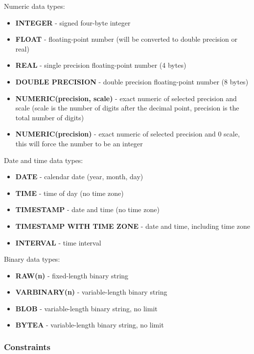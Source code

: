 \documentclass[a4paper,12pt]{article}
\begin{document}
Numeric data types:
\begin{itemize}
	\item \textbf{INTEGER} - signed four-byte integer
	\item \textbf{FLOAT} - floating-point number (will be converted to double precision or real)
	\item \textbf{REAL} - single precision floating-point number (4 bytes)
	\item \textbf{DOUBLE PRECISION} - double precision floating-point number (8 bytes)
	\item \textbf{NUMERIC(precision, scale)} - exact numeric of selected precision and scale (scale is the number of digits after the decimal point, precision is the total number of digits)
	\item \textbf{NUMERIC(precision)} - exact numeric of selected precision and 0 scale, this will force the number to be an integer
\end{itemize}

Date and time data types:
\begin{itemize}
	\item \textbf{DATE} - calendar date (year, month, day)
	\item \textbf{TIME} - time of day (no time zone)
	\item \textbf{TIMESTAMP} - date and time (no time zone)
	\item \textbf{TIMESTAMP WITH TIME ZONE} - date and time, including time zone
	\item \textbf{INTERVAL} - time interval
\end{itemize}

Binary data types:
\begin{itemize}
	\item \textbf{RAW(n)} - fixed-length binary string
	\item \textbf{VARBINARY(n)} - variable-length binary string
	\item \textbf{BLOB} - variable-length binary string, no limit
	\item \textbf{BYTEA} - variable-length binary string, no limit
\end{itemize}

\subsubsection{Constraints}
\end{document}
